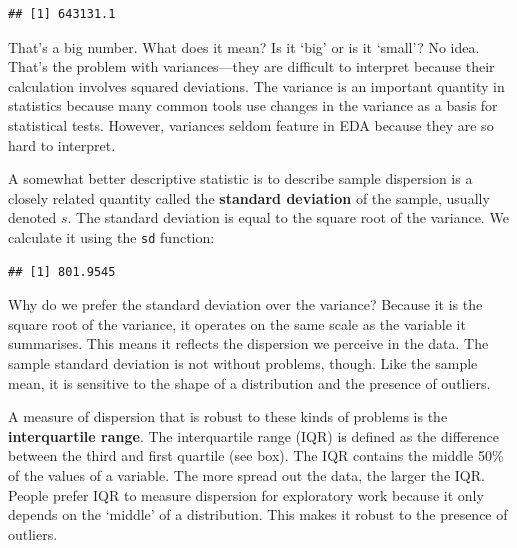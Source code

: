 \documentclass[
]{book}
\newenvironment{Shaded}{\begin{snugshade}}{\end{snugshade}}
\newcommand{\AttributeTok}[1]{\textcolor[rgb]{0.77,0.63,0.00}{#1}}
\newcommand{\ConstantTok}[1]{\textcolor[rgb]{0.00,0.00,0.00}{#1}}
\newcommand{\FunctionTok}[1]{\textcolor[rgb]{0.00,0.00,0.00}{#1}}
\newcommand{\NormalTok}[1]{#1}
\newcommand{\SpecialCharTok}[1]{\textcolor[rgb]{0.00,0.00,0.00}{#1}}
\begin{document}
\begin{Shaded}
\end{Shaded}

\begin{verbatim}
## [1] 643131.1
\end{verbatim}

That's a big number. What does it mean? Is it `big' or is it `small'? No idea. That's the problem with variances---they are difficult to interpret because their calculation involves squared deviations. The variance is an important quantity in statistics because many common tools use changes in the variance as a basis for statistical tests. However, variances seldom feature in EDA because they are so hard to interpret.

A somewhat better descriptive statistic is to describe sample dispersion is a closely related quantity called the \textbf{standard deviation} of the sample, usually denoted \(s\). The standard deviation is equal to the square root of the variance. We calculate it using the \texttt{sd} function:

\begin{Shaded}
\end{Shaded}

\begin{verbatim}
## [1] 801.9545
\end{verbatim}

Why do we prefer the standard deviation over the variance? Because it is the square root of the variance, it operates on the same scale as the variable it summarises. This means it reflects the dispersion we perceive in the data. The sample standard deviation is not without problems, though. Like the sample mean, it is sensitive to the shape of a distribution and the presence of outliers.

A measure of dispersion that is robust to these kinds of problems is the \textbf{interquartile range}. The interquartile range (IQR) is defined as the difference between the third and first quartile (see box). The IQR contains the middle 50\% of the values of a variable. The more spread out the data, the larger the IQR. People prefer IQR to measure dispersion for exploratory work because it only depends on the `middle' of a distribution. This makes it robust to the presence of outliers.
\end{document}
